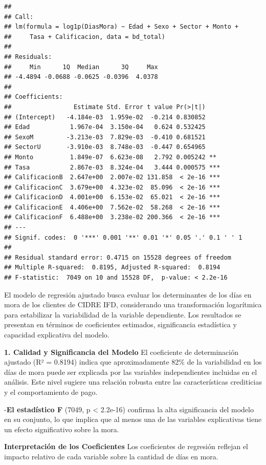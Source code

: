 \documentclass[Royal,times,sageh]{sagej}
\begin{document}
\begin{verbatim}
## 
## Call:
## lm(formula = log1p(DiasMora) ~ Edad + Sexo + Sector + Monto + 
##     Tasa + Calificacion, data = bd_total)
## 
## Residuals:
##     Min      1Q  Median      3Q     Max 
## -4.4894 -0.0688 -0.0625 -0.0396  4.0378 
## 
## Coefficients:
##                 Estimate Std. Error t value Pr(>|t|)    
## (Intercept)   -4.184e-03  1.959e-02  -0.214 0.830852    
## Edad           1.967e-04  3.150e-04   0.624 0.532425    
## SexoM         -3.213e-03  7.829e-03  -0.410 0.681521    
## SectorU       -3.910e-03  8.748e-03  -0.447 0.654965    
## Monto          1.849e-07  6.623e-08   2.792 0.005242 ** 
## Tasa           2.867e-03  8.324e-04   3.444 0.000575 ***
## CalificacionB  2.647e+00  2.007e-02 131.858  < 2e-16 ***
## CalificacionC  3.679e+00  4.323e-02  85.096  < 2e-16 ***
## CalificacionD  4.001e+00  6.153e-02  65.021  < 2e-16 ***
## CalificacionE  4.406e+00  7.562e-02  58.268  < 2e-16 ***
## CalificacionF  6.488e+00  3.238e-02 200.366  < 2e-16 ***
## ---
## Signif. codes:  0 '***' 0.001 '**' 0.01 '*' 0.05 '.' 0.1 ' ' 1
## 
## Residual standard error: 0.4715 on 15528 degrees of freedom
## Multiple R-squared:  0.8195, Adjusted R-squared:  0.8194 
## F-statistic:  7049 on 10 and 15528 DF,  p-value: < 2.2e-16
\end{verbatim}

El modelo de regresión ajustado busca evaluar los determinantes de los
días en mora de los clientes de CIDRE IFD, considerando una
transformación logarítmica para estabilizar la variabilidad de la
variable dependiente. Los resultados se presentan en términos de
coeficientes estimados, significancia estadística y capacidad
explicativa del modelo.

\textbf{1. Calidad y Significancia del Modelo} El coeficiente de
determinación ajustado (R² = 0.8194) indica que aproximadamente 82\% de
la variabilidad en los días de mora puede ser explicada por las
variables independientes incluidas en el análisis. Este nivel sugiere
una relación robusta entre las características crediticias y el
comportamiento de pago.

-\textbf{El estadístico F} (7049, p \textless{} 2.2e-16) confirma la
alta significancia del modelo en su conjunto, lo que implica que al
menos una de las variables explicativas tiene un efecto significativo
sobre la mora.

\textbf{Interpretación de los Coeficientes} Los coeficientes de
regresión reflejan el impacto relativo de cada variable sobre la
cantidad de días en mora.
\end{document}
